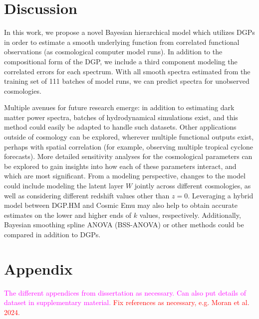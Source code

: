 \documentclass[11pt]{article}
\begin{document}

\section{Discussion}
\label{sec:disc}

In this work, we propose a novel Bayesian hierarchical model which utilizes DGPs in order to estimate a smooth underlying function from correlated functional observations (as cosmological computer model runs). In addition to the compositional form of the DGP, we include a third component modeling the correlated errors for each spectrum. With all smooth spectra estimated from the training set of 111 batches of model runs, we can predict spectra for unobserved cosmologies.

Multiple avenues for future research emerge: in addition to estimating dark matter power spectra, batches of hydrodynamical simulations exist, and this method could easily be adapted to handle such datasets. Other applications outside of cosmology can be explored, wherever multiple functional outputs exist, perhaps with spatial correlation (for example, observing multiple tropical cyclone forecasts). More detailed sensitivity analyses for the cosmological parameters can be explored to gain insights into how each of these parameters interact, and which are most significant. From a modeling perspective, changes to the model could include modeling the latent layer $W$ jointly across different cosmologies, as well as considering different redshift values other than $z=0$. Leveraging a hybrid model between DGP.HM and Cosmic Emu may also help to obtain accurate estimates on the lower and higher ends of $k$ values, respectively. Additionally, Bayesian smoothing spline ANOVA (BSS-ANOVA) or other methods could be compared in addition to DGPs. 

\section{Appendix}
\label{sec:apdx}

\textcolor{magenta}{The different appendices from dissertation as necessary. Can also put details of dataset in supplementary material.} \textcolor{red}{Fix references as necessary, e.g. Moran et al. 2024.}
\end{document}
